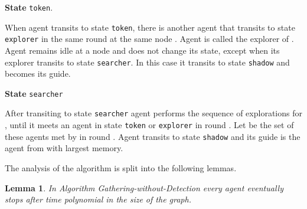\documentclass[11pt]{article}
\newtheorem{lemma}{Lemma}[section]
\begin{document}
            
 \vspace*{0.2cm}
        \noindent
     {\bf State}  {\tt token}.
     
      When agent  transits to state {\tt token}, there is another agent  that transits to state  {\tt explorer} in the same round at the same node .
 Agent  is called the explorer of . 
Agent  remains  idle at a node  and does not change its state, except when its explorer  transits to state {\tt searcher}. In this case it transits
 to state {\tt shadow} and  becomes its guide. 
  
  \vspace*{0.2cm}
        \noindent
    {\bf State} {\tt searcher}
    
After transiting to state {\tt searcher} agent  performs the sequence of explorations  for {}, until it meets an agent in state
{\tt token} or {\tt explorer} in round . Let  be the set of these agents met by  in round . Agent  transits to state {\tt shadow} and its guide is the 
agent from  with largest memory.   

The analysis of the algorithm is split into the following lemmas.

\begin{lemma}\label{term2}
In Algorithm Gathering-without-Detection every agent eventually stops after time polynomial in the size of the graph.
\end{lemma}
\end{document}
